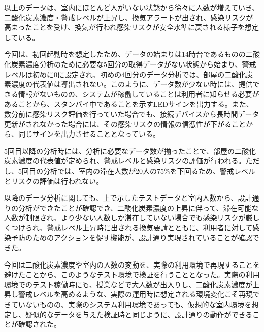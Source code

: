 以上のデータは、室内にほとんど人がいない状態から徐々に人数が増えていき、二酸化炭素濃度・警戒レベルが上昇し、換気アラートが出され、感染リスクが高まったことを受け、換気が行われ感染リスクが安全水準に戻される様子を想定している。

今回は、初回起動時を想定したため、データの始まりは14時台であるものの二酸化炭素濃度分析のために必要な5回分の取得データがない状態から始まり、警戒レベルは初めに0に設定され、初めの4回分のデータ分析では、部屋の二酸化炭素濃度の代表値は導出されない。このように、データ数が少ない時には、提供できる情報がないものの、システムが稼働していることは利用者に知らせる必要があることから、スタンバイ中であることを示すLEDサインを出力する。また、数分前に感染リスク評価を行っていた場合でも、接続デバイスから長時間データ更新がされなかった場合には、その感染リスクの情報の信憑性が下がることから、同じサインを出力させることとなっている。

5回目以降の分析時には、分析に必要なデータ数が揃ったことで、部屋の二酸化炭素濃度の代表値が定められ、警戒レベルと感染リスクの評価が行われる。ただし、5回目の分析では、室内の滞在人数が20人の75\%を下回るため、警戒レベルとリスクの評価は行われない。

以降のデータ分析に関しても、上で示したテストデータと室内人数から、設計通りの分析ができたことが確認でき、二酸化炭素濃度の上昇に伴って、滞在可能な人数が制限され、より少ない人数しか滞在していない場合でも感染リスクが厳しくつけられ、警戒レベル上昇時に出される換気要請とともに、利用者に対して感染予防のためのアクションを促す機能が、設計通り実現されていることが確認できた。

今回は二酸化炭素濃度や室内の人数の変動を、実際の利用環境で再現することを避けたことから、このようなテスト環境で検証を行うこととなった。実際の利用環境でのテスト稼働時にも、授業などで大人数が出入りし、二酸化炭素濃度が上昇し警戒レベルを高めるような、実際の運用時に想定される環境変化こそ再現できていないものの、実際のシステム利用環境であっても、仮想的な室内環境を想定し、疑似的なデータを与えた検証時と同じように、設計通りの動作ができることが確認された。



